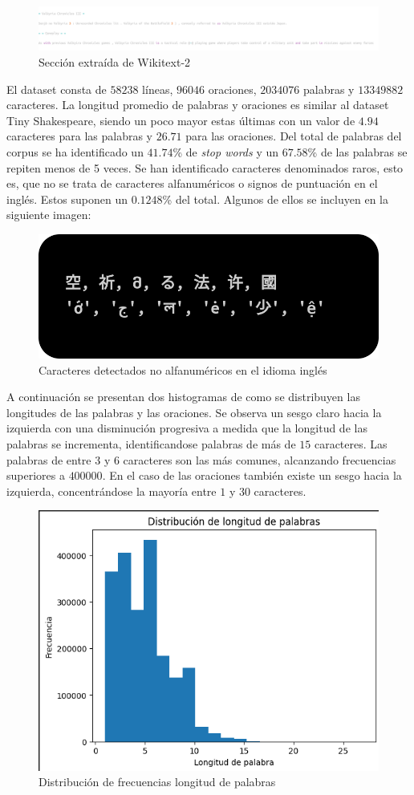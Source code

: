 \documentclass[11pt]{book}
\begin{document}
\begin{figure}[h]
    \centering
    \includegraphics[width=0.5\linewidth]{img/wikitext2.png}
    \caption{Sección extraída de Wikitext-2}
    \label{fig:placeholder43}
\end{figure}

El dataset consta de $58238$ líneas, $96046$ oraciones, $2034076$ palabras y $13349882$ caracteres. La longitud promedio de palabras y oraciones es similar al dataset Tiny Shakespeare, siendo un poco mayor estas últimas con un valor de $4.94$ caracteres para las palabras y $26.71$ para las oraciones. Del total de palabras del corpus se ha identificado un $41.74$\% de \textit{stop words} y un $67.58$\% de las palabras se repiten menos de 5 veces. Se han identificado caracteres denominados raros, esto es, que no se trata de caracteres alfanuméricos o signos de puntuación en el inglés. Estos suponen un $0.1248$\% del total. Algunos de ellos se incluyen en la siguiente imagen:

\begin{figure}[h]
    \centering
    \includegraphics[width=0.5\linewidth]{img/caracteres_raros.png}
    \caption{Caracteres detectados no alfanuméricos en el idioma inglés}
    \label{fig:placeholder38}
\end{figure}

A continuación se presentan dos histogramas de como se distribuyen las longitudes de las palabras y las oraciones. Se observa un sesgo claro hacia la izquierda con una disminución progresiva a medida que la longitud de las palabras se incrementa, identificandose palabras de más de $15$ caracteres. Las palabras de entre $3$ y $6$ caracteres son las más comunes, alcanzando frecuencias superiores a $400000$. En el caso de las oraciones también existe un sesgo hacia la izquierda, concentrándose la mayoría entre $1$ y $30$ caracteres.

\begin{figure}[h]
    \centering
    \includegraphics[width=0.5\linewidth]{img/hist_long_w_wiki.png}
    \caption{Distribución de frecuencias longitud de palabras}
    \label{fig:placeholder40}
\end{figure}
\end{document}
